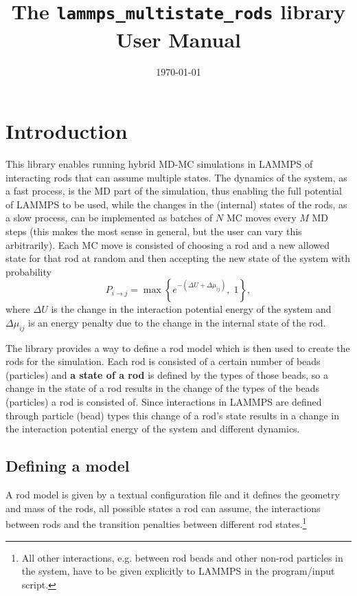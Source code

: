\documentclass[a4paper]{article}
\title{\vspace{-15mm} The \texttt{lammps\_multistate\_rods} library \\
\vspace{5pt} \large User Manual
\vspace{20pt}
}
\author{
\text{Eugen Ro{ž}i{ć}}
}
\date{\today}
\begin{document}
\maketitle

\section{Introduction}

This library enables running hybrid MD-MC simulations in LAMMPS of interacting rods that can assume
multiple states. The dynamics of the system, as a fast process, is the MD part of the simulation, thus
enabling the full potential of LAMMPS to be used, while the changes in the (internal) states of the rods,
as a slow process, can be implemented as batches of $N$ MC moves every $M$ MD steps (this makes the most
sense in general, but the user can vary this arbitrarily).
Each MC move is consisted of choosing a rod and a new allowed state for that rod at random and then
accepting the new state of the system with probability
\begin{equation}
	P_{i \rightarrow j} = \max\left\{e^{-\left(\Delta U + \Delta \mu_{ij}\right)},\; 1\right\},
\end{equation}
where $\Delta U$ is the change in the interaction potential energy of the system and $\Delta \mu_{ij}$ is
an energy penalty due to the change in the internal state of the rod.

\vspace{1em}

The library provides a way to define a rod model which is then used to create the rods for the
simulation. Each rod is consisted of a certain number of beads (particles) and \textbf{a state of a
rod} is defined by the types of those beads, so a change in the state of a rod results in the change of
the types of the beads (particles) a rod is consisted of. Since interactions in LAMMPS are defined
through particle (bead) types this change of a rod's state results in a change in the interaction
potential energy of the system and different dynamics.

\subsection{Defining a model}

A rod model is given by a textual configuration file and it defines the geometry and mass of the rods,
all possible states a rod can assume, the interactions between rods and the transition penalties between
different rod states.\footnote{All other interactions, e.g. between rod beads and other non-rod particles
in the system, have to be given explicitly to LAMMPS in the program/input script.}
\end{document}
